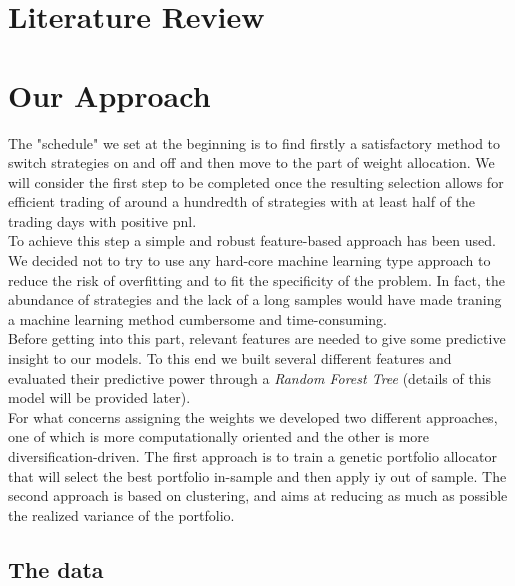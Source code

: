 \documentclass[a4paper]{article}
\begin{document}

\section*{Literature Review}


\section*{Our Approach}

The "schedule" we set at the beginning is to find firstly a satisfactory method to switch strategies on and off and then move to the part of weight allocation. We will consider the first step to be completed once the resulting selection allows for efficient trading of around a hundredth of strategies with at least half of the trading days with positive pnl.\\
To achieve this step a simple and robust feature-based approach has been used. We decided not to try to use any hard-core machine learning type approach to reduce the risk of overfitting and to fit the specificity of the problem. In fact, the abundance of strategies and the lack of a long samples would have made traning a machine learning method cumbersome and time-consuming.\\
Before getting into this part, relevant features are needed to give some predictive insight to our models. To this end we built several different features and evaluated their predictive power through a \textit{Random Forest Tree} (details of this model will be provided later).\\
For what concerns assigning the weights we developed two different approaches, one of which is more computationally oriented and the other is more diversification-driven. The first approach is to train a genetic portfolio allocator that will select the best portfolio in-sample and then apply iy out of sample. The second approach is based on clustering, and aims at reducing as much as possible the realized variance of the portfolio.\\


\subsection*{The data}
\end{document}
